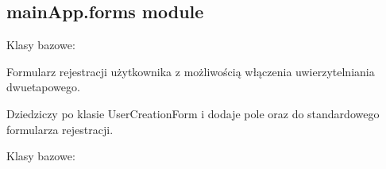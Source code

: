 \documentclass[letterpaper,11pt,polish]{sphinxmanual}
\begin{document}
\subsection{mainApp.forms module}
\label{\detokenize{mainApp:module-mainApp.forms}}\label{\detokenize{mainApp:mainapp-forms-module}}

\begin{fulllineitems}
\label{\detokenize{mainApp:mainApp.forms.UserForm}}
\pysigstartsignatures
{}
\pysigstopsignatures
\sphinxAtStartPar
Klasy bazowe: 

\sphinxAtStartPar
Formularz rejestracji użytkownika z możliwością włączenia uwierzytelniania dwuetapowego.

\sphinxAtStartPar
Dziedziczy po klasie UserCreationForm i dodaje pole  oraz  do standardowego formularza rejestracji.

\begin{fulllineitems}
\label{\detokenize{mainApp:mainApp.forms.UserForm.Meta}}
\pysigstartsignatures
{}
\pysigstopsignatures
\sphinxAtStartPar
Klasy bazowe: 

\begin{fulllineitems}
\label{\detokenize{mainApp:mainApp.forms.UserForm.Meta.fields}}
\pysigstartsignatures
{}
\pysigstopsignatures
\end{fulllineitems}


\end{fulllineitems}
\end{fulllineitems}
\end{document}
